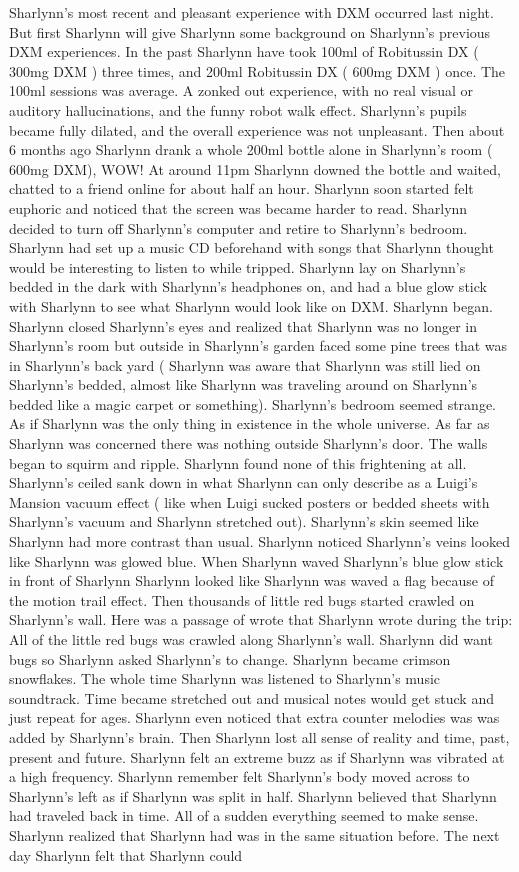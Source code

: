\documentclass[12pt]{book}
\begin{document}
Sharlynn's most recent and pleasant experience with DXM occurred last night. But first Sharlynn will give Sharlynn some background on Sharlynn's previous DXM experiences. In the past Sharlynn have took 100ml of Robitussin DX ( 300mg DXM ) three times, and 200ml Robitussin DX ( 600mg DXM ) once. The 100ml sessions was average. A zonked out experience, with no real visual or auditory hallucinations, and the funny robot walk effect. Sharlynn's pupils became fully dilated, and the overall experience was not unpleasant. Then about 6 months ago Sharlynn drank a whole 200ml bottle alone in Sharlynn's room ( 600mg DXM), WOW! At around 11pm Sharlynn downed the bottle and waited, chatted to a friend online for about half an hour. Sharlynn soon started felt euphoric and noticed that the screen was became harder to read. Sharlynn decided to turn off Sharlynn's computer and retire to Sharlynn's bedroom. Sharlynn had set up a music CD beforehand with songs that Sharlynn thought would be interesting to listen to while tripped. Sharlynn lay on Sharlynn's bedded in the dark with Sharlynn's headphones on, and had a blue glow stick with Sharlynn to see what Sharlynn would look like on DXM. Sharlynn began. Sharlynn closed Sharlynn's eyes and realized that Sharlynn was no longer in Sharlynn's room but outside in Sharlynn's garden faced some pine trees that was in Sharlynn's back yard ( Sharlynn was aware that Sharlynn was still lied on Sharlynn's bedded, almost like Sharlynn was traveling around on Sharlynn's bedded like a magic carpet or something). Sharlynn's bedroom seemed strange. As if Sharlynn was the only thing in existence in the whole universe. As far as Sharlynn was concerned there was nothing outside Sharlynn's door. The walls began to squirm and ripple. Sharlynn found none of this frightening at all. Sharlynn's ceiled sank down in what Sharlynn can only describe as a Luigi's Mansion vacuum effect ( like when Luigi sucked posters or bedded sheets with Sharlynn's vacuum and Sharlynn stretched out). Sharlynn's skin seemed like Sharlynn had more contrast than usual. Sharlynn noticed Sharlynn's veins looked like Sharlynn was glowed blue. When Sharlynn waved Sharlynn's blue glow stick in front of Sharlynn Sharlynn looked like Sharlynn was waved a flag because of the motion trail effect. Then thousands of little red bugs started crawled on Sharlynn's wall. Here was a passage of wrote that Sharlynn wrote during the trip: All of the little red bugs was crawled along Sharlynn's wall. Sharlynn did want bugs so Sharlynn asked Sharlynn's to change. Sharlynn became crimson snowflakes. The whole time Sharlynn was listened to Sharlynn's music soundtrack. Time became stretched out and musical notes would get stuck and just repeat for ages. Sharlynn even noticed that extra counter melodies was was added by Sharlynn's brain. Then Sharlynn lost all sense of reality and time, past, present and future. Sharlynn felt an extreme buzz as if Sharlynn was vibrated at a high frequency. Sharlynn remember felt Sharlynn's body moved across to Sharlynn's left as if Sharlynn was split in half. Sharlynn believed that Sharlynn had traveled back in time. All of a sudden everything seemed to make sense. Sharlynn realized that Sharlynn had was in the same situation before. The next day Sharlynn felt that Sharlynn could 
\end{document}
